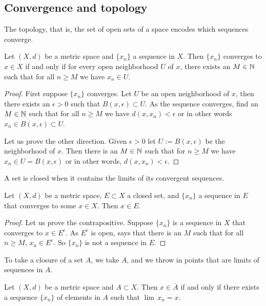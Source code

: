 \subsection{Convergence and topology}

The topology, that is, the set of open sets of a space encodes which
sequences converge.

\begin{prop} \label{prop:msconvtopo}
Let $(X,d)$ be a metric space and $\{x_n\}$ a sequence in $X$.  Then
$\{ x_n \}$ converges to $x \in X$ if and only if for every open neighborhood
$U$ of $x$, there exists an $M \in {\mathbb{N}}$ such that for all $n \geq M$
we have $x_n \in U$.
\end{prop}

\begin{proof}
First suppose $\{ x_n \}$ converges.  Let $U$ be an open neighborhood
of $x$, then there exists an $\epsilon > 0$ such that $B(x,\epsilon) \subset
U$.  As the sequence converges, find an $M \in {\mathbb{N}}$ such that for all $n \geq
M$ we have $d(x,x_n) < \epsilon$ or in other words $x_n \in B(x,\epsilon)
\subset U$.

Let us prove the other direction.  Given $\epsilon > 0$ let $U :=
B(x,\epsilon)$ be the neighborhood of $x$.  Then there is an $M \in {\mathbb{N}}$
such that for $n \geq M$ we have $x_n \in U = B(x,\epsilon)$ or in other
words, $d(x,x_n) < \epsilon$.
\end{proof}

A set is closed when it contains the limits of its convergent sequences.

\begin{prop} \label{prop:msclosedlim}
Let $(X,d)$ be a metric space, $E \subset X$ a closed set,
and $\{ x_n \}$ a sequence in $E$ that converges to some $x \in X$.
Then $x \in E$.
\end{prop}

\begin{proof}
Let us prove the contrapositive.
Suppose $\{ x_n \}$ is a sequence in $X$ that converges to $x \in E^c$.
As $E^c$ is open,  says that there is
an $M$ such that for all $n \geq M$,
$x_n \in E^c$.  So $\{ x_n \}$  is not a sequence in $E$.
\end{proof}

To take a closure of a set $A$, we take $A$, and we throw in 
points that are limits of sequences in $A$.

\begin{prop} \label{prop:msclosureapprseq}
Let $(X,d)$ be a metric space and $A \subset X$.
Then $x \in \overline{A}$ if and only if there exists a sequence $\{ x_n \}$ of
elements in $A$ such that $\lim\, x_n = x$.
\end{prop}

